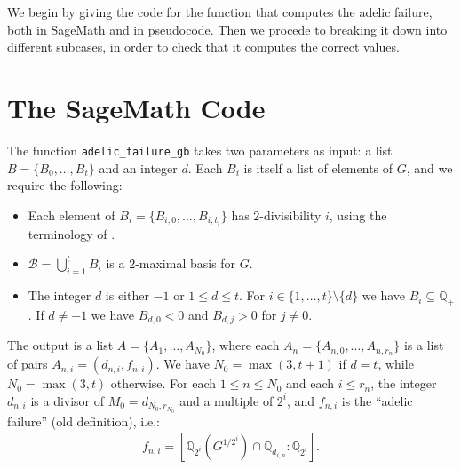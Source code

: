 \documentclass[10pt,a4paper]{article}
\author{Sebastiano Tronto}
\theoremstyle{definition}
\begin{document}
We begin by giving the code for the function that computes the adelic failure, both in SageMath and in pseudocode. Then we procede to breaking it down into different subcases, in order to check that it computes the correct values.

\section{The SageMath Code}

The function \texttt{adelic\_failure\_gb} takes two parameters as input: a list $B=\{B_0,\dots, B_t\}$ and an integer $d$. Each $B_i$ is itself a list of elements of $G$, and we require the following:
\begin{itemize}
\item Each element of $B_i=\{B_{i,0},\dots,B_{i,t_i}\}$ has $2$-divisibility $i$, using the terminology of \cite{DebryPerucca}.
\item $\mathcal{B}=\bigcup_{i=1}^t B_i$ is a $2$-maximal basis for $G$.
\item The integer $d$ is either $-1$ or $1\leq d\leq t$. For $i\in\{1,\dots,t\}\setminus\{d\}$ we have $B_i\subseteq \mathbb{Q}_+$. If $d\neq -1$ we have $B_{d,0}<0$ and $B_{d,j}>0$ for $j\neq 0$.
\end{itemize}
The output is a list $A=\{A_1,\dots,A_{N_0}\}$, where each $A_n=\{A_{n,0},\dots,A_{n,r_n}\}$ is a list of pairs $A_{n,i}=(d_{n,i},f_{n,i})$. We have $N_0=\max(3,t+1)$ if $d=t$, while $N_0=\max(3,t)$ otherwise. For each $1\leq n\leq N_0$ and each $i\leq r_n$, the integer $d_{n,i}$ is a divisor of $M_0=d_{N_0,r_{N_0}}$ and a multiple of $2^i$, and $f_{n,i}$ is the ``adelic failure'' (old definition), i.e.:
\begin{align*}
f_{n,i}=\left[\mathbb{Q}_{2^i}\left(G^{1/2^i}\right)\cap \mathbb{Q}_{d_{i,n}}:\mathbb{Q}_{2^i}\right].
\end{align*}
\end{document}
